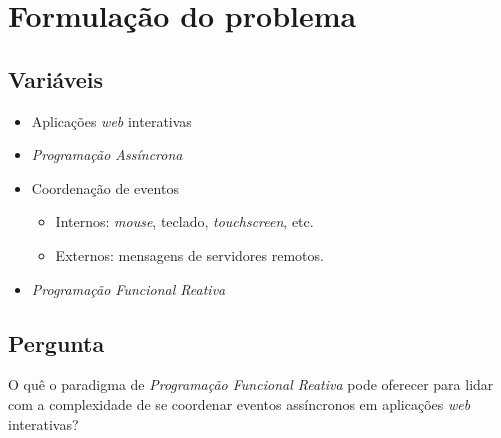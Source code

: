 \section{Formulação do problema}\label{lproblema}

\subsection{Variáveis}

\begin{itemize}[noitemsep]
  \item Aplicações \textit{web} interativas
  \item \textit{Programação Assíncrona}
  \item Coordenação de eventos
    \begin{itemize}[noitemsep]
      \item Internos: \textit{mouse}, teclado, \textit{touchscreen}, etc.
      \item Externos: mensagens de servidores remotos.
    \end{itemize}
  \item \textit{Programação Funcional Reativa}
\end{itemize}


\subsection{Pergunta}

O quê o paradigma de \textit{Programação Funcional Reativa}
pode oferecer para lidar com a complexidade de se coordenar
eventos assíncronos em aplicações \textit{web} interativas?

